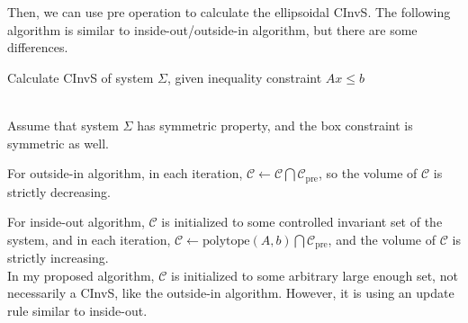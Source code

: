 \documentclass{article}
\begin{document}
Then, we can use pre operation to calculate the ellipsoidal CInvS. The following algorithm is similar to inside-out/outside-in algorithm, but there are some differences.
 
\begin{algorithm}[H]
	\centering
	\caption{Calculate CInvS of system $\Sigma$, given inequality constraint $Ax \leq b$}
	\begin{algorithmic}[1]
		\\
		Assume that system $\Sigma$ has symmetric property, and the box constraint is symmetric as well.
		\State{}
		\State{}%
		\State\hspace{\algorithmicindent}
		\State{}
		\State{}
		\EndFunction
	\end{algorithmic}
	\label{alg_cinvs}
\end{algorithm}

For outside-in algorithm, in each iteration, $\mathcal C \leftarrow \mathcal C \bigcap \mathcal C_{\text{pre}}$, so the volume of $\mathcal C$ is strictly decreasing.

For inside-out algorithm, $\mathcal C$ is initialized to some controlled invariant set of the system, and in each iteration, $\mathcal C \leftarrow \text{polytope}(A,b) \bigcap \mathcal C_{\text{pre}}$, and the volume of $\mathcal C$ is strictly increasing.\\

In my proposed algorithm, $\mathcal C$ is initialized to some arbitrary large enough set, not necessarily a CInvS, like the outside-in algorithm. However, it is using an update rule similar to inside-out. 
\end{document}
